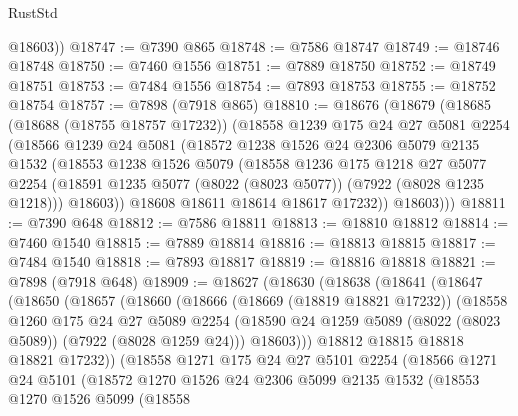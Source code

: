 \begin{lexlean}{RustStd}
\begin{coremodule}
        @18603))
@18747 := @7390 @865
@18748 := @7586 @18747
@18749 := @18746 @18748
@18750 := @7460 @1556
@18751 := @7889 @18750
@18752 := @18749 @18751
@18753 := @7484 @1556
@18754 := @7893 @18753
@18755 := @18752 @18754
@18757 := @7898 (@7918 @865)
@18810 := @18676
    (@18679
      (@18685
        (@18688 (@18755 @18757 @17232))
        (@18558
          @1239
          @175
          @24
          @27
          @5081
          @2254
          (@18566
            @1239
            @24
            @5081
            (@18572
              @1238
              @1526
              @24
              @2306
              @5079
              @2135
              @1532
              (@18553
                @1238
                @1526
                @5079
                (@18558
                  @1236
                  @175
                  @1218
                  @27
                  @5077
                  @2254
                  (@18591 @1235 @5077 (@8022 (@8023 @5077)) (@7922 (@8028 @1235 @1218)))
                  @18603))
              @18608
              @18611
              @18614
              @18617
              @17232))
          @18603)))
@18811 := @7390 @648
@18812 := @7586 @18811
@18813 := @18810 @18812
@18814 := @7460 @1540
@18815 := @7889 @18814
@18816 := @18813 @18815
@18817 := @7484 @1540
@18818 := @7893 @18817
@18819 := @18816 @18818
@18821 := @7898 (@7918 @648)
@18909 := @18627
    (@18630
      (@18638
        (@18641
          (@18647
            (@18650
              (@18657
                (@18660
                  (@18666
                    (@18669 (@18819 @18821 @17232))
                    (@18558
                      @1260
                      @175
                      @24
                      @27
                      @5089
                      @2254
                      (@18590 @24 @1259 @5089 (@8022 (@8023 @5089)) (@7922 (@8028 @1259 @24)))
                      @18603)))
                @18812
                @18815
                @18818
                @18821
                @17232))
            (@18558
              @1271
              @175
              @24
              @27
              @5101
              @2254
              (@18566
                @1271
                @24
                @5101
                (@18572
                  @1270
                  @1526
                  @24
                  @2306
                  @5099
                  @2135
                  @1532
                  (@18553
                    @1270
                    @1526
                    @5099
                    (@18558

\end{coremodule}
\end{lexlean}
